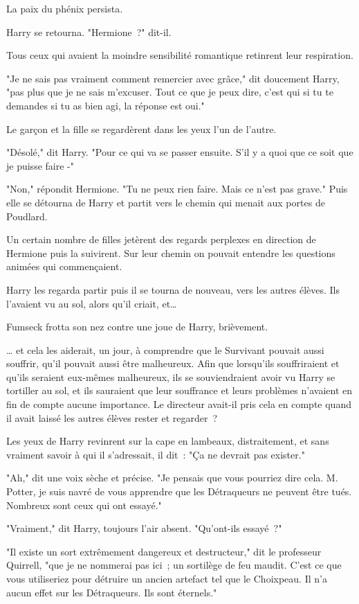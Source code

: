 La paix du phénix persista.

Harry se retourna. "Hermione~?" dit-il.

Tous ceux qui avaient la moindre sensibilité romantique retinrent leur respiration.

"Je ne sais pas vraiment comment remercier avec grâce," dit doucement Harry, "pas plus que je ne sais m'excuser. Tout ce que je peux dire, c'est qui si tu te demandes si tu as bien agi, la réponse est oui."

Le garçon et la fille se regardèrent dans les yeux l'un de l'autre.

"Désolé," dit Harry. "Pour ce qui va se passer ensuite. S'il y a quoi que ce soit que je puisse faire -"

"Non," répondit Hermione. "Tu ne peux rien faire. Mais ce n'est pas grave." Puis elle se détourna de Harry et partit vers le chemin qui menait aux portes de Poudlard.

Un certain nombre de filles jetèrent des regards perplexes en direction de Hermione puis la suivirent. Sur leur chemin on pouvait entendre les questions animées qui commençaient.

Harry les regarda partir puis il se tourna de nouveau, vers les autres élèves. Ils l'avaient vu au sol, alors qu'il criait, et…

Fumseck frotta son nez contre une joue de Harry, brièvement.

… et cela les aiderait, un jour, à comprendre que le Survivant pouvait aussi souffrir, qu'il pouvait aussi être malheureux. Afin que lorsqu'ils souffriraient et qu'ils seraient eux-mêmes malheureux, ils se souviendraient avoir vu Harry se tortiller au sol, et ils sauraient que leur souffrance et leurs problèmes n'avaient en fin de compte aucune importance. Le directeur avait-il pris cela en compte quand il avait laissé les autres élèves rester et regarder~?

Les yeux de Harry revinrent sur la cape en lambeaux, distraitement, et sans vraiment savoir à qui il s'adressait, il dit~: "Ça ne devrait pas exister."

"Ah," dit une voix sèche et précise. "Je pensais que vous pourriez dire cela. M. Potter, je suis navré de vous apprendre que les Détraqueurs ne peuvent être tués. Nombreux sont ceux qui ont essayé."

"Vraiment," dit Harry, toujours l'air absent. "Qu'ont-ils essayé~?"

"Il existe un sort extrêmement dangereux et destructeur," dit le professeur Quirrell, "que je ne nommerai pas ici~; un sortilège de feu maudit. C'est ce que vous utiliseriez pour détruire un ancien artefact tel que le Choixpeau. Il n'a aucun effet sur les Détraqueurs. Ils sont éternels."

